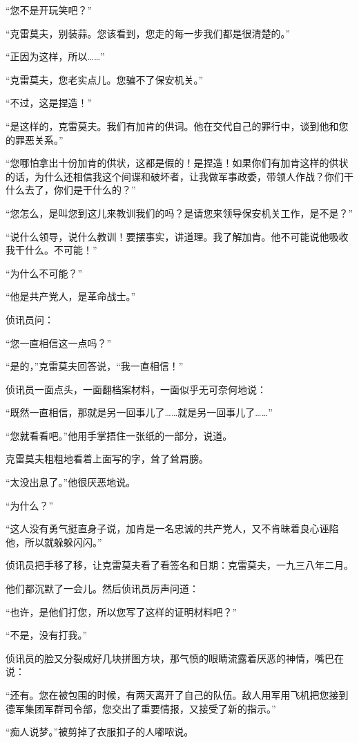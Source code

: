 “您不是开玩笑吧？”

“克雷莫夫，别装蒜。您该看到，您走的每一步我们都是很清楚的。”

“正因为这样，所以……”

“克雷莫夫，您老实点儿。您骗不了保安机关。”

“不过，这是捏造！”

“是这样的，克雷莫夫。我们有加肯的供词。他在交代自己的罪行中，谈到他和您的罪恶关系。”

“您哪怕拿出十份加肯的供状，这都是假的！是捏造！如果你们有加肯这样的供状的话，为什么还相信我这个间谍和破坏者，让我做军事政委，带领人作战？你们干什么去了，你们是干什么的？”

“您怎么，是叫您到这儿来教训我们的吗？是请您来领导保安机关工作，是不是？”

“说什么领导，说什么教训！要摆事实，讲道理。我了解加肯。他不可能说他吸收我干什么。不可能！”

“为什么不可能？”

“他是共产党人，是革命战士。”

侦讯员问：

“您一直相信这一点吗？”

“是的，”克雷莫夫回答说，“我一直相信！”

侦讯员一面点头，一面翻档案材料，一面似乎无可奈何地说：

“既然一直相信，那就是另一回事儿了……就是另一回事儿了……”

“您就看看吧。”他用手掌捂住一张纸的一部分，说道。

克雷莫夫粗粗地看着上面写的字，耸了耸肩膀。

“太没出息了。”他很厌恶地说。

“为什么？”

“这人没有勇气挺直身子说，加肯是一名忠诚的共产党人，又不肯昧着良心诬陷他，所以就躲躲闪闪。”

侦讯员把手移了移，让克雷莫夫看了看签名和日期：克雷莫夫，一九三八年二月。

他们都沉默了一会儿。然后侦讯员厉声问道：

“也许，是他们打您，所以您写了这样的证明材料吧？”

“不是，没有打我。”

侦讯员的脸又分裂成好几块拼图方块，那气愤的眼睛流露着厌恶的神情，嘴巴在说：

“还有。您在被包围的时候，有两天离开了自己的队伍。敌人用军用飞机把您接到德军集团军群司令部，您交出了重要情报，又接受了新的指示。”

“痴人说梦。”被剪掉了衣服扣子的人嘟哝说。

